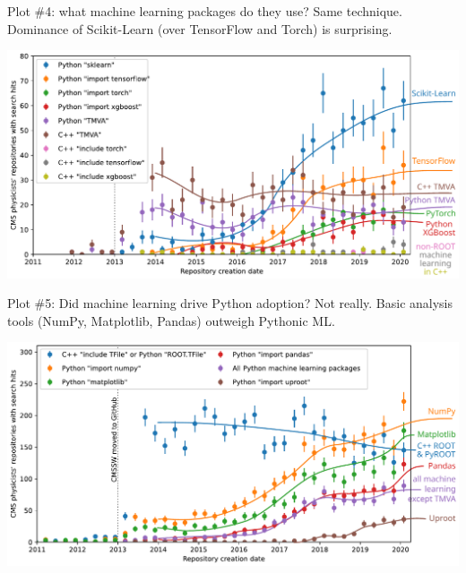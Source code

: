 \documentclass[aspectratio=169]{beamer}
\begin{document}
\begin{frame}{Plot \#4: what machine learning packages do they use?}
\vspace{0.25 cm}
Same technique. Dominance of Scikit-Learn (over TensorFlow and Torch) is surprising.

\vspace{0.15 cm}
\includegraphics[width=\linewidth]{04-github-machine-learning.pdf}
\end{frame}

\begin{frame}{Plot \#5: Did machine learning drive Python adoption?}
\vspace{0.25 cm}
Not really. Basic analysis tools (NumPy, Matplotlib, Pandas) outweigh Pythonic ML.

\vspace{0.15 cm}
\includegraphics[width=\linewidth]{05-github-anyroot-python-machinelearning-uproot.pdf}
\end{frame}
\end{document}
